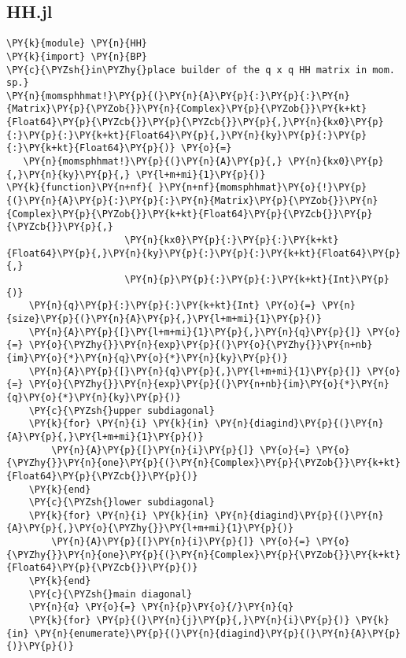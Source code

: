\subsection{HH.jl}\label{subsec:hh}
\begin{Verbatim}[commandchars=\\\{\}]
\PY{k}{module} \PY{n}{HH}
\PY{k}{import} \PY{n}{BP}
\PY{c}{\PYZsh{}in\PYZhy{}place builder of the q x q HH matrix in mom. sp.}
\PY{n}{momsphhmat!}\PY{p}{(}\PY{n}{A}\PY{p}{:}\PY{p}{:}\PY{n}{Matrix}\PY{p}{\PYZob{}}\PY{n}{Complex}\PY{p}{\PYZob{}}\PY{k+kt}{Float64}\PY{p}{\PYZcb{}}\PY{p}{\PYZcb{}}\PY{p}{,}\PY{n}{kx0}\PY{p}{:}\PY{p}{:}\PY{k+kt}{Float64}\PY{p}{,}\PY{n}{ky}\PY{p}{:}\PY{p}{:}\PY{k+kt}{Float64}\PY{p}{)} \PY{o}{=}
   \PY{n}{momsphhmat!}\PY{p}{(}\PY{n}{A}\PY{p}{,} \PY{n}{kx0}\PY{p}{,}\PY{n}{ky}\PY{p}{,} \PY{l+m+mi}{1}\PY{p}{)}
\PY{k}{function}\PY{n+nf}{ }\PY{n+nf}{momsphhmat}\PY{o}{!}\PY{p}{(}\PY{n}{A}\PY{p}{:}\PY{p}{:}\PY{n}{Matrix}\PY{p}{\PYZob{}}\PY{n}{Complex}\PY{p}{\PYZob{}}\PY{k+kt}{Float64}\PY{p}{\PYZcb{}}\PY{p}{\PYZcb{}}\PY{p}{,}
                     \PY{n}{kx0}\PY{p}{:}\PY{p}{:}\PY{k+kt}{Float64}\PY{p}{,}\PY{n}{ky}\PY{p}{:}\PY{p}{:}\PY{k+kt}{Float64}\PY{p}{,}
                     \PY{n}{p}\PY{p}{:}\PY{p}{:}\PY{k+kt}{Int}\PY{p}{)}
    \PY{n}{q}\PY{p}{:}\PY{p}{:}\PY{k+kt}{Int} \PY{o}{=} \PY{n}{size}\PY{p}{(}\PY{n}{A}\PY{p}{,}\PY{l+m+mi}{1}\PY{p}{)}
    \PY{n}{A}\PY{p}{[}\PY{l+m+mi}{1}\PY{p}{,}\PY{n}{q}\PY{p}{]} \PY{o}{=} \PY{o}{\PYZhy{}}\PY{n}{exp}\PY{p}{(}\PY{o}{\PYZhy{}}\PY{n+nb}{im}\PY{o}{*}\PY{n}{q}\PY{o}{*}\PY{n}{ky}\PY{p}{)}
    \PY{n}{A}\PY{p}{[}\PY{n}{q}\PY{p}{,}\PY{l+m+mi}{1}\PY{p}{]} \PY{o}{=} \PY{o}{\PYZhy{}}\PY{n}{exp}\PY{p}{(}\PY{n+nb}{im}\PY{o}{*}\PY{n}{q}\PY{o}{*}\PY{n}{ky}\PY{p}{)}
    \PY{c}{\PYZsh{}upper subdiagonal}
    \PY{k}{for} \PY{n}{i} \PY{k}{in} \PY{n}{diagind}\PY{p}{(}\PY{n}{A}\PY{p}{,}\PY{l+m+mi}{1}\PY{p}{)}
        \PY{n}{A}\PY{p}{[}\PY{n}{i}\PY{p}{]} \PY{o}{=} \PY{o}{\PYZhy{}}\PY{n}{one}\PY{p}{(}\PY{n}{Complex}\PY{p}{\PYZob{}}\PY{k+kt}{Float64}\PY{p}{\PYZcb{}}\PY{p}{)}
    \PY{k}{end}
    \PY{c}{\PYZsh{}lower subdiagonal}
    \PY{k}{for} \PY{n}{i} \PY{k}{in} \PY{n}{diagind}\PY{p}{(}\PY{n}{A}\PY{p}{,}\PY{o}{\PYZhy{}}\PY{l+m+mi}{1}\PY{p}{)}
        \PY{n}{A}\PY{p}{[}\PY{n}{i}\PY{p}{]} \PY{o}{=} \PY{o}{\PYZhy{}}\PY{n}{one}\PY{p}{(}\PY{n}{Complex}\PY{p}{\PYZob{}}\PY{k+kt}{Float64}\PY{p}{\PYZcb{}}\PY{p}{)}
    \PY{k}{end}
    \PY{c}{\PYZsh{}main diagonal}
    \PY{n}{α} \PY{o}{=} \PY{n}{p}\PY{o}{/}\PY{n}{q}
    \PY{k}{for} \PY{p}{(}\PY{n}{j}\PY{p}{,}\PY{n}{i}\PY{p}{)} \PY{k}{in} \PY{n}{enumerate}\PY{p}{(}\PY{n}{diagind}\PY{p}{(}\PY{n}{A}\PY{p}{)}\PY{p}{)}

\end{Verbatim}
